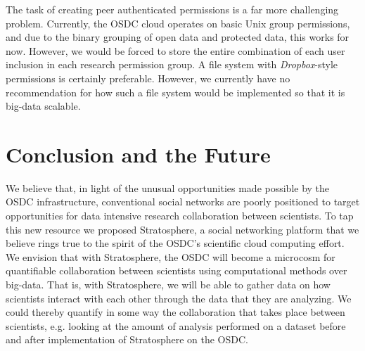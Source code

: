 \begin{multicols*}{2}
The task of creating peer authenticated permissions is a far more
challenging problem. Currently, the OSDC cloud operates on basic Unix
group permissions, and due to the binary grouping of open data and
protected data, this works for now. However, we would be forced to
store the entire combination of each user inclusion in each research
permission group. A file system with \emph{Dropbox}-style
permissions is certainly preferable. However, we currently have no
recommendation for how such a file system would be implemented so that
it is big-data scalable.


\section{Conclusion and the Future}
\label{sec:conclusion}

We believe that, in light of the unusual opportunities made possible
by the OSDC infrastructure, conventional social networks are poorly
positioned to target opportunities for data intensive research
collaboration between scientists. To tap this new resource we proposed
Stratosphere, a social networking platform that we believe rings true
to the spirit of the OSDC's scientific cloud computing effort. We
envision that with Stratosphere, the OSDC will become a microcosm for
quantifiable collaboration between scientists using computational
methods over big-data. That is, with Stratosphere, we will be able to
gather data on how scientists interact with each other through the
data that they are analyzing. We could thereby quantify in some way
the collaboration that takes place between scientists, e.g. looking at
the amount of analysis performed on a dataset before and after
implementation of Stratosphere on the OSDC.

\end{multicols*}

